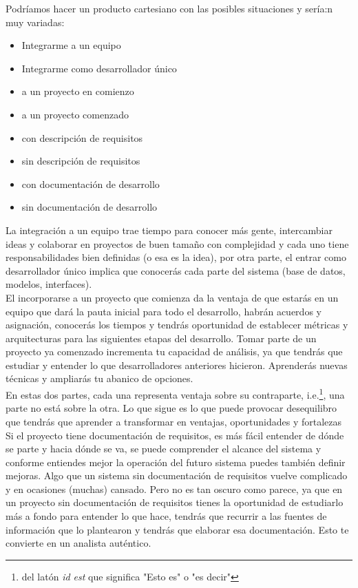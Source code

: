 \documentclass[12pt,spanish,lettersize]{book}
\begin{document}
Podr\'iamos hacer un producto cartesiano con las posibles situaciones y ser\'ia:n muy variadas:
\begin{itemize}
\item Integrarme a un equipo 
\item Integrarme como desarrollador \'unico 
\item a un proyecto en comienzo 
\item a un proyecto comenzado 
\item con descripci\'on de requisitos 
\item sin descripci\'on de requisitos 
\item con documentaci\'on de desarrollo 
\item sin documentaci\'on de desarrollo 
\end{itemize}

La integraci\'on a un equipo trae tiempo para conocer m\'as gente, intercambiar ideas y colaborar en proyectos de buen tama\~no con complejidad y cada uno tiene responsabilidades bien definidas (o esa es la idea), por otra parte, el entrar como desarrollador \'unico implica que conocer\'as cada parte del sistema (base de datos, modelos, interfaces).\\

El incorporarse a un proyecto que comienza da la ventaja de que estar\'as en un equipo que dar\'a la pauta inicial para todo el desarrollo, habr\'an acuerdos y asignaci\'on, conocer\'as los tiempos y tendr\'as oportunidad de establecer m\'etricas y arquitecturas para las siguientes etapas del desarrollo. Tomar parte de un proyecto ya comenzado incrementa tu capacidad de an\'alisis, ya que tendr\'as que estudiar y entender lo que desarrolladores anteriores hicieron. Aprender\'as nuevas t\'ecnicas y ampliar\'as tu abanico de opciones.\\

En estas dos partes, cada una representa ventaja sobre su contraparte, i.e.\footnote{del lat\'on \emph{id est} que significa "Esto es" o "es decir"}, una parte no est\'a sobre la otra. Lo que sigue es lo que puede provocar desequilibro que tendr\'as que aprender a transformar en ventajas, oportunidades y fortalezas\\

Si el proyecto tiene documentaci\'on de requisitos, es m\'as f\'acil entender de d\'onde se parte y hacia d\'onde se va, se puede comprender el alcance del sistema y conforme entiendes mejor la operaci\'on del futuro sistema puedes tambi\'en definir mejoras. Algo que un sistema sin documentaci\'on de requisitos vuelve complicado y en ocasiones (muchas) cansado. Pero no es tan oscuro como parece, ya que en un proyecto sin documentaci\'on de requisitos tienes la oportunidad de estudiarlo m\'as a fondo para entender lo que hace, tendr\'as que recurrir a las fuentes de informaci\'on que lo plantearon y tendr\'as que elaborar esa documentaci\'on. Esto te convierte en un analista aut\'entico.\\
\end{document}
